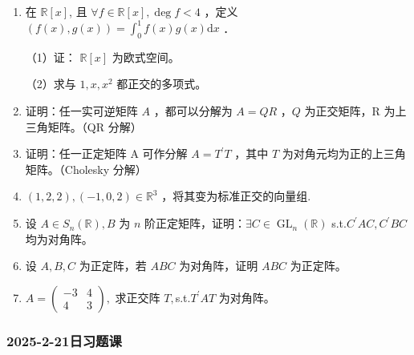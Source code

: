 \begin{enumerate}
    \item 在 $\mathbb{R}[x]$, 且 $\forall f \in \mathbb{R}[x],\deg f<4$ ，定义 $(f(x) , g(x))=\int_0^1 f(x) g(x) \mathrm{d} x$ ．

    （1）证： $\mathbb{R}[x]$ 为欧式空间。
    
    （2）求与 $1, x, x^2$ 都正交的多项式。
    \item 证明：任一实可逆矩阵 $A$ ，都可以分解为 $A=Q R$ ，$Q$ 为正交矩阵，R 为上三角矩阵。（QR 分解）
    \item 证明：任一正定矩阵 A 可作分解 $A=T^{\prime} T$ ，其中 $T$ 为对角元均为正的上三角矩阵。（Cholesky 分解）
    \item $(1,2,2),(-1,0,2) \in \mathbb{R}^3$ ，将其变为标准正交的向量组.
    \item 设 $A \in S_n(\mathbb{R}),B$ 为 $n$ 阶正定矩阵，证明：$\exists C \in \operatorname{GL}_{n}(\mathbb{R})$ s.t.$C^\prime AC,C^{\prime}BC$ 均为对角阵。
    \item 设 $A,B,C$ 为正定阵，若 $ABC$ 为对角阵，证明 $ABC$ 为正定阵。
    \item $A=\begin{pmatrix}-3 &4\\4 &3\end{pmatrix},$ 求正交阵 $T,$s.t.$T^{\prime}AT$ 为对角阵。
\end{enumerate}

\subsubsection{2025-2-21日习题课}

